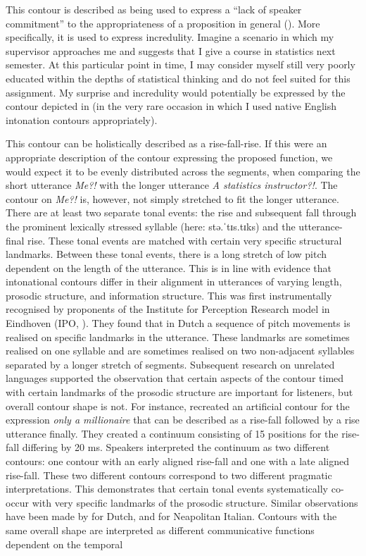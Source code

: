 This contour is described as being used to express a “lack of speaker commitment” to the appropriateness of a proposition in general (\citealt[243]{HirschbergWard1992}). More specifically, it is used to express incredulity. Imagine a scenario in which my supervisor approaches me and suggests that I give a course in statistics next semester. At this particular point in time, I may consider myself still very poorly educated within the depths of statistical thinking and do not feel suited for this assignment. My surprise and incredulity would potentially be expressed by the contour depicted in  (in the very rare occasion in which I used native English intonation contours appropriately).

This contour can be holistically described as a rise-fall-rise. If this were an appropriate description of the contour expressing the proposed function, we would expect it to be evenly distributed across the segments, when comparing the short utterance \textit{Me?!} with the longer utterance \textit{A statistics instructor?!}. The contour on \textit{Me?!} is, however, not simply stretched to fit the longer utterance. There are at least two separate tonal events: the rise and subsequent fall through the prominent lexically stressed syllable (here: stə.ˈtɪs.tɪks) and the utterance-final rise. These tonal events are matched with certain very specific structural landmarks. Between these tonal events, there is a long stretch of low pitch dependent on the length of the utterance. This is in line with evidence that intonational contours differ in their alignment in utterances of varying length, prosodic structure, and information structure. This was first instrumentally recognised by proponents of the Institute for Perception Research model in Eindhoven (IPO, \citealt{CohenHart1968,HartCohen1973,HartCollier1975}). They found that in Dutch a sequence of pitch movements is realised on specific landmarks in the utterance. These landmarks are sometimes realised on one syllable and are sometimes realised on two non-adjacent syllables separated by a longer stretch of segments. Subsequent research on unrelated languages supported the observation that certain aspects of the contour timed with certain landmarks of the prosodic structure are important for listeners, but overall contour shape is not. For instance, \citet{PierrSteele1989} recreated an artificial contour for the expression \textit{only a millionaire} that can be described as a rise-fall followed by a rise utterance finally. They created a continuum consisting of 15 positions for the rise-fall differing by 20 ms. Speakers interpreted the continuum as two different contours: one contour with an early aligned rise-fall and one with a late aligned rise-fall. These two different contours correspond to two different pragmatic interpretations. This demonstrates that certain tonal events systematically co-occur with very specific landmarks of the prosodic structure. Similar observations have been made by \citet{RietveldGussenhoven1995} for Dutch, and \citet{DimperioHouse1997} for Neapolitan Italian. Contours with the same overall shape are interpreted as different communicative functions dependent on the temporal 